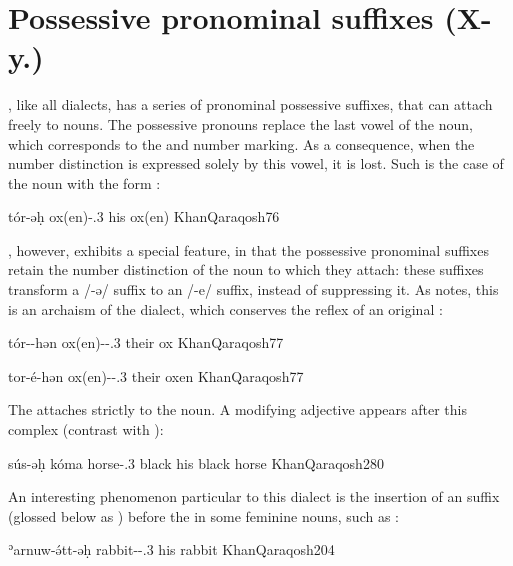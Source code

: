 \section{Possessive pronominal suffixes (X-y.\poss)}
\label{ss:Qar_Poss}

\Qar, like all  dialects, has a series of pronominal possessive suffixes, that can attach freely to nouns. The possessive pronouns replace the last vowel of the noun, which  corresponds to the  and number marking. As a consequence, when the number distinction is expressed solely by this vowel, it is lost. Such is the case of the noun  with the \pl* form :

{tór-əḥ}
{ox(en)-\poss.3\masc{}}
{his ox(en)}
{KhanQaraqosh}{76}

\Qar, however, exhibits a special feature, in that the \pl* possessive pronominal suffixes  retain the number distinction of the noun to which they attach: these suffixes transform a \pl* /-ə/ suffix to an /-e/ suffix, instead of suppressing it. As \citet[77]{KhanQaraqosh} notes, this is an archaism of the dialect, which conserves the reflex of an original :

{tór-\zero-hən}
{ox(en)-\sg-\poss.3\pl}
{their ox}
{KhanQaraqosh}{77}

{tor-é-hən}
{ox(en)-\pl-\poss.3\pl}
{their oxen}
{KhanQaraqosh}{77}

The   attaches strictly to the \prim noun. A modifying adjective appears after this complex (contrast with ):

{sús-əḥ kóma}
{horse-\poss.3\masc{} black}
{his black horse}
{KhanQaraqosh}{280}	

An interesting phenomenon particular to this dialect is the insertion of an  suffix (glossed below as \fem) before the  in some feminine nouns, such as :

{ʾarnuw-ə́tt-əḥ}
{rabbit-\fem-\poss.3\masc}
{his rabbit}
{KhanQaraqosh}{204}

